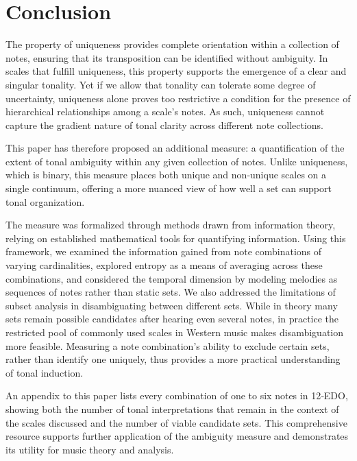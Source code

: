 \documentclass[10pt,twocolumn]{article}
\numberwithin{equation}{section} %
\begin{document}


\section{Conclusion}

The property of
uniqueness provides complete orientation within a collection of notes, ensuring
that its transposition can be identified without ambiguity. In scales that
fulfill uniqueness, this property supports the emergence of a clear and
singular tonality. Yet if we allow that tonality can tolerate some degree of
uncertainty, uniqueness alone proves too restrictive a condition for the
presence of hierarchical relationships among a scale’s notes. As such,
uniqueness cannot capture the gradient nature of tonal clarity across different
note collections.

This paper has
therefore proposed an additional measure: a quantification of the extent of
tonal ambiguity within any given collection of notes. Unlike uniqueness, which
is binary, this measure places both unique and non‑unique scales on a single
continuum, offering a more nuanced view of how well a set can support tonal
organization.

The measure was
formalized through methods drawn from information theory, relying on
established mathematical tools for quantifying information. Using this
framework, we examined the information gained from note combinations of varying
cardinalities, explored entropy as a means of averaging across these
combinations, and considered the temporal dimension by modeling melodies as
sequences of notes rather than static sets. We also addressed the limitations
of subset analysis in disambiguating between different sets. While in theory
many sets remain possible candidates after hearing even several notes, in
practice the restricted pool of commonly used scales in Western music makes
disambiguation more feasible. Measuring a note combination’s ability to exclude
certain sets, rather than identify one uniquely, thus provides a more practical
understanding of tonal induction.

An appendix to
this paper lists every combination of one to six notes in 12‑EDO, showing both
the number of tonal interpretations that remain in the context of the scales
discussed and the number of viable candidate sets. This comprehensive resource
supports further application of the ambiguity measure and demonstrates its
utility for music theory and analysis.
\end{document}
